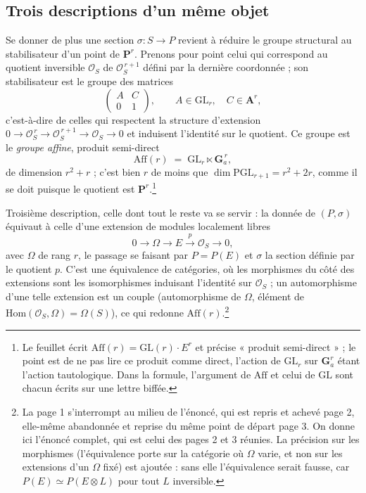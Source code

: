 \documentclass[11pt,a4paper]{article}
\begin{document}
\subsection*{Trois descriptions d'un même objet}

Se donner de plus une section $\sigma : S \to P$ revient à réduire le groupe
structural au stabilisateur d'un point de $\mathbf{P}^r$. Prenons pour point
celui qui correspond au quotient inversible $\mathcal{O}_S$ de
$\mathcal{O}_S^{\,r+1}$ défini par la dernière coordonnée ; son stabilisateur
est le groupe des matrices
\[
  \begin{pmatrix} A & C \\ 0 & 1 \end{pmatrix},
  \qquad A \in \mathrm{GL}_r, \quad C \in \mathbf{A}^r,
\]
c'est-à-dire de celles qui respectent la structure d'extension
$0 \to \mathcal{O}_S^{\,r} \to \mathcal{O}_S^{\,r+1} \to \mathcal{O}_S \to 0$
et induisent l'identité sur le quotient. Ce groupe est le \emph{groupe
affine}, produit semi-direct
\[
  \mathrm{Aff}(r) \;=\; \mathrm{GL}_r \ltimes \mathbf{G}_a^{\,r},
\]
de dimension $r^2 + r$ ; c'est bien $r$ de moins que
$\dim \mathrm{PGL}_{r+1} = r^2 + 2r$, comme il se doit puisque le quotient est
$\mathbf{P}^r$.\footnote{Le feuillet écrit $\mathrm{Aff}(r) =
\mathrm{GL}(r)\cdot E^r$ et précise « produit semi-direct » ; le point est de
ne pas lire ce produit comme direct, l'action de $\mathrm{GL}_r$ sur
$\mathbf{G}_a^r$ étant l'action tautologique. Dans la formule, l'argument de
$\mathrm{Aff}$ et celui de $\mathrm{GL}$ sont chacun écrits sur une lettre
biffée.}

Troisième description, celle dont tout le reste va se servir : la donnée de
$(P, \sigma)$ équivaut à celle d'une extension de modules localement libres
\[
  0 \longrightarrow \Omega \longrightarrow E
  \xrightarrow{\ p\ } \mathcal{O}_S \longrightarrow 0,
\]
avec $\Omega$ de rang $r$, le passage se faisant par $P = P(E)$ et
$\sigma$ la section définie par le quotient $p$. C'est une équivalence de
catégories, où les morphismes du côté des extensions sont les isomorphismes
induisant l'identité sur $\mathcal{O}_S$ ; un automorphisme d'une telle
extension est un couple (automorphisme de $\Omega$, élément de
$\mathrm{Hom}(\mathcal{O}_S, \Omega) = \Omega(S)$), ce qui redonne
$\mathrm{Aff}(r)$.\footnote{La page 1 s'interrompt au milieu de
l'énoncé, qui est repris et achevé page 2, elle-même abandonnée et reprise du
même point de départ page 3. On donne ici l'énoncé complet, qui est celui des
pages 2 et 3 réunies. La précision sur les morphismes (l'équivalence
porte sur la catégorie où $\Omega$ varie, et non sur les extensions d'un
$\Omega$ fixé) est ajoutée : sans elle l'équivalence serait fausse, car
$P(E) \simeq P(E \otimes L)$ pour tout $L$ inversible.}
\end{document}
